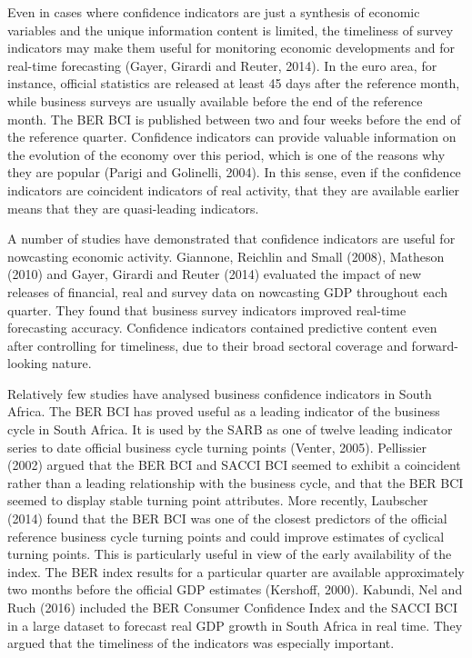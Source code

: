 \documentclass[11pt,]{article}
\begin{document}
Even in cases where confidence indicators are just a synthesis of
economic variables and the unique information content is limited, the
timeliness of survey indicators may make them useful for monitoring
economic developments and for real-time forecasting (Gayer, Girardi and
Reuter, 2014). In the euro area, for instance, official statistics are
released at least 45 days after the reference month, while business
surveys are usually available before the end of the reference month. The
BER BCI is published between two and four weeks before the end of the
reference quarter. Confidence indicators can provide valuable
information on the evolution of the economy over this period, which is
one of the reasons why they are popular (Parigi and Golinelli, 2004). In
this sense, even if the confidence indicators are coincident indicators
of real activity, that they are available earlier means that they are
quasi-leading indicators.

A number of studies have demonstrated that confidence indicators are
useful for nowcasting economic activity. Giannone, Reichlin and Small
(2008), Matheson (2010) and Gayer, Girardi and Reuter (2014) evaluated
the impact of new releases of financial, real and survey data on
nowcasting GDP throughout each quarter. They found that business survey
indicators improved real-time forecasting accuracy. Confidence
indicators contained predictive content even after controlling for
timeliness, due to their broad sectoral coverage and forward-looking
nature.

Relatively few studies have analysed business confidence indicators in
South Africa. The BER BCI has proved useful as a leading indicator of
the business cycle in South Africa. It is used by the SARB as one of
twelve leading indicator series to date official business cycle turning
points (Venter, 2005). Pellissier (2002) argued that the BER BCI and
SACCI BCI seemed to exhibit a coincident rather than a leading
relationship with the business cycle, and that the BER BCI seemed to
display stable turning point attributes. More recently, Laubscher (2014)
found that the BER BCI was one of the closest predictors of the official
reference business cycle turning points and could improve estimates of
cyclical turning points. This is particularly useful in view of the
early availability of the index. The BER index results for a particular
quarter are available approximately two months before the official GDP
estimates (Kershoff, 2000). Kabundi, Nel and Ruch (2016) included the
BER Consumer Confidence Index and the SACCI BCI in a large dataset to
forecast real GDP growth in South Africa in real time. They argued that
the timeliness of the indicators was especially important.
\end{document}
